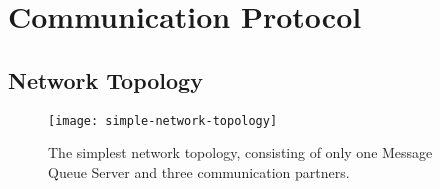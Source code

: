 
\chapter{Communication Protocol}
\label{cha:comm-prot}

\section{Network Topology}
\label{sec:network-topology}

\begin{figure}[h]
  \begin{center}
    \texttt{[image: simple-network-topology]}
  \end{center}
  \caption[Network  Topology   (simple)]{The  simplest  network  topology,
    consisting of  only one Message  Queue Server and  three communication
    partners.}
  \label{fig:simple-net-top}
\end{figure}


